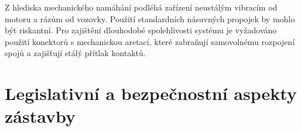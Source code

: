 Z hlediska mechanického namáhání podléhá zařízení neustálým vibracím od motoru a rázům od vozovky. 
Použití standardních násuvných propojek by mohlo být riskantní. 
Pro zajištění dlouhodobé spolehlivosti systému je vyžadováno použití konektorů s mechanickou aretací, které zabraňují 
samovolnému rozpojení spojů a zajišťují stálý přítlak kontaktů.

\chapter{Legislativní a bezpečnostní aspekty zástavby}




